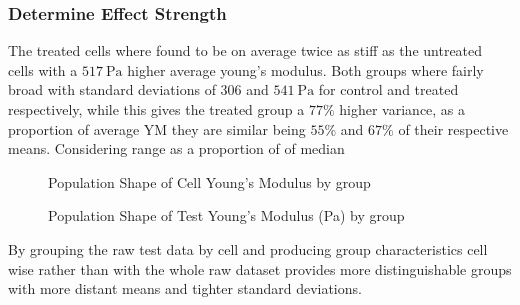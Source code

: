 \documentclass[
  paper=a4,
  ,captions=tableheading
]{scrartcl}
\makeatletter
\newcommand*\pandocbounded[1]{%
  \sbox\pandoc@box{#1}%
  \Gscale@div\@tempa{\textheight}{\dimexpr\ht\pandoc@box+\dp\pandoc@box\relax}%
  \Gscale@div\@tempb{\linewidth}{\wd\pandoc@box}%
  \ifdim\@tempb\p@<\@tempa\p@\let\@tempa\@tempb\fi%
  \ifdim\@tempa\p@<\p@\scalebox{\@tempa}{\usebox\pandoc@box}%
  \else\usebox{\pandoc@box}%
  \fi%
}
\makeatother
\begin{document}
\subsubsection{Determine Effect
Strength}\label{determine-effect-strength}

The treated cells where found to be on average twice as stiff as the
untreated cells with a \(517 \ \text{Pa}\) higher average young's
modulus. Both groups where fairly broad with standard deviations of
\(306\) and \(541 \ \text{Pa}\) for control and treated respectively,
while this gives the treated group a \(77\%\) higher variance, as a
proportion of average YM they are similar being \(55\%\) and \(67\%\) of
their respective means. Considering range as a proportion of of median

\noindent
\begin{minipage}[t]{0.48\textwidth}
\begin{figure}
\centering
\pandocbounded{}
\caption{Population Shape of Cell Young's Modulus by group}
\end{figure}
\end{minipage}
\hfill
\begin{minipage}[t]{0.48\textwidth}
\begin{figure}
\centering
\pandocbounded{}
\caption{Population Shape of Test Young's Modulus (Pa) by group}
\end{figure}
\end{minipage}

By grouping the raw test data by cell and producing group
characteristics cell wise rather than with the whole raw dataset
provides more distinguishable groups with more distant means and tighter
standard deviations.
\end{document}
